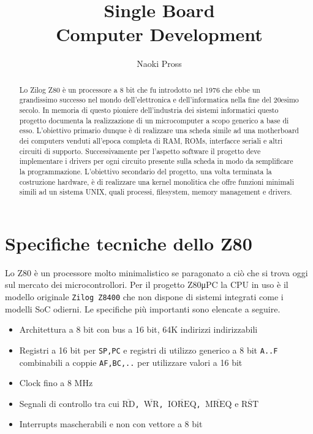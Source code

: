 \documentclass[a4paper, 11pt, twoside]{article}
\title{\vspace{-1cm}\texttt{\prj} Single Board \\ Computer Development }
\author{Naoki Pross}
\newcommand{\prj}{Z80μPC\xspace}
\newcommand{\inv}[1]{$\overline{\mbox{#1}}$}
\begin{document}
\maketitle
\begin{abstract}

    Lo Zilog Z80 \`e un processore a 8 bit che fu introdotto nel 1976 che ebbe
    un grandissimo successo nel mondo dell'elettronica e dell'informatica
    nella fine del 20esimo secolo. In memoria di questo pioniere
    dell'industria dei sistemi informatici questo progetto documenta la
    realizzazione di un microcomputer a scopo generico a base di esso.
    L'obiettivo primario dunque \`e di realizzare una scheda simile ad una
    motherboard dei computers venduti all'epoca completa di RAM, ROMs,
    interfacce seriali e altri circuiti di supporto. Successivamente per
    l'aspetto software il progetto deve implementare i drivers per ogni
    circuito presente sulla scheda in modo da semplificare la programmazione. 
    L'obiettivo secondario del progetto, una volta terminata la costruzione
    hardware, \`e di realizzare una kernel monolitica che offre funzioni
    minimali simili ad un sistema UNIX, quali processi, filesystem, memory
    management e drivers.

\end{abstract}

\section{Specifiche tecniche dello Z80}
Lo Z80 \`e un processore molto minimalistico se paragonato a ci\`o che si
trova oggi sul mercato dei microcontrollori. Per il progetto \prj la CPU in
uso \`e il modello originale \texttt{Zilog Z8400} che non dispone di sistemi
integrati come i modelli SoC odierni. Le specifiche pi\`u importanti sono
elencate a seguire.

\begin{itemize}
    \item Architettura a 8 bit con bus a 16 bit, 64K indirizzi indirizzabili
    \item Registri a 16 bit per {\tt SP,PC} e registri di utilizzo generico a
        8 bit {\tt A..F} combinabili a coppie {\tt AF,BC,..} per utilizzare
        valori a 16 bit
    \item Clock fino a 8 MHz
    \item Segnali di controllo tra cui \texttt{\inv{RD}, \inv{WR},
        \inv{IOREQ}, \inv{MREQ}} e \texttt{\inv{RST}}
    \item Interrupts mascherabili e non con vettore a 8 bit
\end{itemize}
\end{document}
